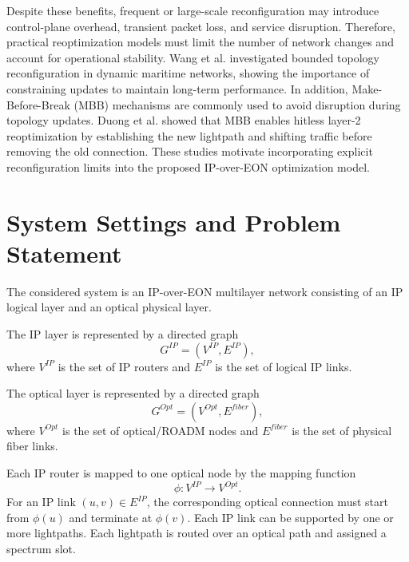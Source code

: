 \documentclass[conference]{IEEEtran}
\begin{document}
Despite these benefits, frequent or large-scale reconfiguration may introduce control-plane overhead, transient packet loss, and service disruption. Therefore, practical reoptimization models must limit the number of network changes and account for operational stability. Wang et al. \cite{11248858} investigated bounded topology reconfiguration in dynamic maritime networks, showing the importance of constraining updates to maintain long-term performance. In addition, Make-Before-Break (MBB) mechanisms are commonly used to avoid disruption during topology updates. Duong et al. \cite{9462438} showed that MBB enables hitless layer-2 reoptimization by establishing the new lightpath and shifting traffic before removing the old connection. These studies motivate incorporating explicit reconfiguration limits into the proposed IP-over-EON optimization model.

\section{System Settings and Problem Statement}
\label{sec:system-problem}

The considered system is an IP-over-EON multilayer network consisting of an IP logical layer and an optical physical layer.

The IP layer is represented by a directed graph
\begin{equation}
    G^{IP} = \left(V^{IP}, E^{IP}\right),
\end{equation}
where $V^{IP}$ is the set of IP routers and $E^{IP}$ is the set of logical IP links.

The optical layer is represented by a directed graph
\begin{equation}
    G^{Opt} = \left(V^{Opt}, E^{fiber}\right),
\end{equation}
where $V^{Opt}$ is the set of optical/ROADM nodes and $E^{fiber}$ is the set of physical fiber links.

Each IP router is mapped to one optical node by the mapping function
\begin{equation}
    \phi: V^{IP} \rightarrow V^{Opt}.
\end{equation}
For an IP link $(u,v)\in E^{IP}$, the corresponding optical connection must start from $\phi(u)$ and terminate at $\phi(v)$. Each IP link can be supported by one or more lightpaths. Each lightpath is routed over an optical path and assigned a spectrum slot.
\end{document}
